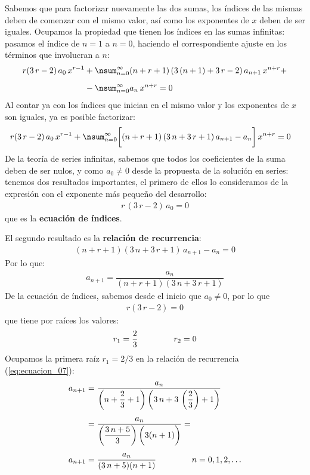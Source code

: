 Sabemos que para factorizar nuevamente las dos sumas, los índices de las mismas deben de comenzar con el mismo valor, así como los exponentes de $x$ deben de ser iguales. Ocupamos la propiedad que tienen los índices en las sumas infinitas: pasamos el índice de $n = 1$ a $n = 0$, haciendo el correspondiente ajuste en los términos que involucran a $n$:
\begin{align*}
r( 3 \, r - 2) \, a_{0} \, x^{r-1} &+ \nsum_{n=0}^{\infty} (n + r + 1) \, (3 \, (n + 1) + 3 \, r - 2) \, a_{n+1} \, x^{n+r} + \\[0.5em]
&- \nsum_{n=0}^{\infty} a_{n} \, x^{n+r} = 0
\end{align*}    
Al contar ya con los índices que inician en el mismo valor y los exponentes de $x$ son iguales, ya es posible factorizar:
\begin{align*}
r( 3 \, r - 2) \, a_{0} \, x^{r-1} &+ \nsum_{n=0}^{\infty} \bigg[ (n + r + 1) \, (3 \, n + 3 \, r + 1) \, a_{n+1} - a_{n} \bigg] \, x^{n+r} = 0    
\end{align*}
De la teoría de series infinitas, sabemos que todos los coeficientes de la suma deben de ser nulos, y como $a_{0} \neq 0$ desde la propuesta de la solución en series: tenemos dos resultados importantes, el primero de ellos lo consideramos de la expresión con el exponente más pequeño del desarrollo:
\begin{align*}
r \, (3 \, r - 2) \, a_{0} = 0
\end{align*}
que es la \textbf{ecuación de índices}.
\par
El segundo resultado es la \textbf{relación de recurrencia}:
\begin{align*}
(n + r + 1)(3 \, n + 3 \, r + 1) \, a_{n+1} - a_{n} = 0
\end{align*}
Por lo que:
\begin{align}
a_{n+1} = \dfrac{a_{n}}{(n + r + 1)(3 \, n + 3 \, r + 1)}
\label{eq:ecuacion_07}
\end{align}
De la ecuación de índices, sabemos desde el inicio que $a_{0} \neq 0$, por lo que
\begin{align}
r (3 \, r - 2) = 0
\label{eq:ecuacion_06}
\end{align}
que tiene por raíces los valores:
\begin{align*}
r_{1} = \dfrac{2}{3} \hspace{1.5cm} r_{2} = 0
\end{align*}
Ocupamos la primera raíz $r_{1} = 2/3$ en la relación de recurrencia (\ref{eq:ecuacion_07}):
\begin{align}
\begin{aligned}[b]
a_{n+1} &= \dfrac{a_{n}}{ \left( n + \dfrac{2}{3} + 1\right) \left(3 \, n + 3 \, \left( \dfrac{2}{3} \right) + 1\right)} \\[0.5em]
&= \dfrac{a_{n}}{\left( \dfrac{3 \, n + 5}{3} \right) \bigg( 3 (n + 1) \bigg)} = \\[0.5em]
a_{n+1} &= \dfrac{a_{n}}{(3 \, n + 5)(n + 1)} \hspace{1.5cm} n = 0, 1, 2, \ldots
\end{aligned}
\label{eq:ecuacion_08}    
\end{align}
